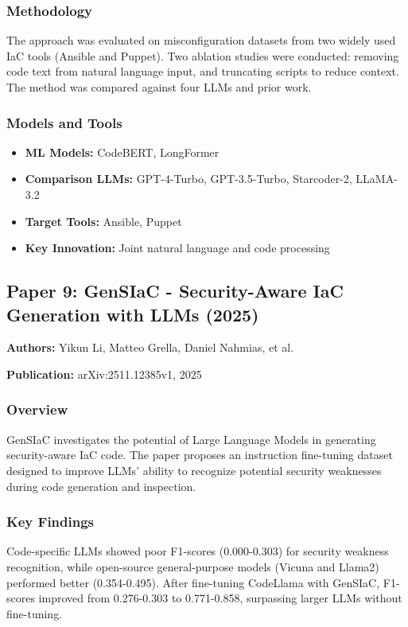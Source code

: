 \documentclass[11pt,a4paper]{article}
\begin{document}
\subsubsection{Methodology}
The approach was evaluated on misconfiguration datasets from two widely used IaC tools (Ansible and Puppet). Two ablation studies were conducted: removing code text from natural language input, and truncating scripts to reduce context. The method was compared against four LLMs and prior work.

\subsubsection{Models and Tools}
\begin{itemize}
    \item \textbf{ML Models:} CodeBERT, LongFormer
    \item \textbf{Comparison LLMs:} GPT-4-Turbo, GPT-3.5-Turbo, Starcoder-2, LLaMA-3.2
    \item \textbf{Target Tools:} Ansible, Puppet
    \item \textbf{Key Innovation:} Joint natural language and code processing
\end{itemize}

\subsection{Paper 9: GenSIaC - Security-Aware IaC Generation with LLMs (2025)}

\textbf{Authors:} Yikun Li, Matteo Grella, Daniel Nahmias, et al.

\textbf{Publication:} arXiv:2511.12385v1, 2025

\subsubsection{Overview}
GenSIaC investigates the potential of Large Language Models in generating security-aware IaC code. The paper proposes an instruction fine-tuning dataset designed to improve LLMs' ability to recognize potential security weaknesses during code generation and inspection.

\subsubsection{Key Findings}
Code-specific LLMs showed poor F1-scores (0.000-0.303) for security weakness recognition, while open-source general-purpose models (Vicuna and Llama2) performed better (0.354-0.495). After fine-tuning CodeLlama with GenSIaC, F1-scores improved from 0.276-0.303 to 0.771-0.858, surpassing larger LLMs without fine-tuning.
\end{document}
